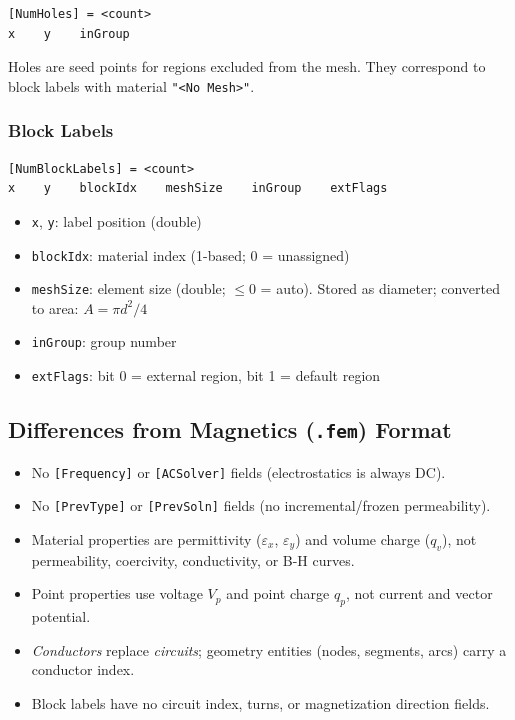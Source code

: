 \documentclass[11pt]{article}
\begin{document}
\begin{lstlisting}
[NumHoles] = <count>
x    y    inGroup
\end{lstlisting}

Holes are seed points for regions excluded from the mesh.  They
correspond to block labels with material \texttt{"<No Mesh>"}.

\subsubsection{Block Labels}

\begin{lstlisting}
[NumBlockLabels] = <count>
x    y    blockIdx    meshSize    inGroup    extFlags
\end{lstlisting}

\begin{itemize}[nosep]
  \item \texttt{x}, \texttt{y}: label position (double)
  \item \texttt{blockIdx}: material index (1-based; 0 = unassigned)
  \item \texttt{meshSize}: element size (double; $\leq 0$ = auto).
        Stored as diameter; converted to area: $A = \pi d^2/4$
  \item \texttt{inGroup}: group number
  \item \texttt{extFlags}: bit 0 = external region, bit 1 = default region
\end{itemize}

\subsection{Differences from Magnetics (\texttt{.fem}) Format}

\begin{itemize}
  \item No \texttt{[Frequency]} or \texttt{[ACSolver]} fields
        (electrostatics is always DC).
  \item No \texttt{[PrevType]} or \texttt{[PrevSoln]} fields
        (no incremental/frozen permeability).
  \item Material properties are permittivity ($\varepsilon_x$,
        $\varepsilon_y$) and volume charge ($q_v$), not permeability,
        coercivity, conductivity, or B-H curves.
  \item Point properties use voltage $V_p$ and point charge $q_p$,
        not current and vector potential.
  \item \emph{Conductors} replace \emph{circuits}; geometry entities
        (nodes, segments, arcs) carry a conductor index.
  \item Block labels have no circuit index, turns, or magnetization
        direction fields.
\end{itemize}
\end{document}
